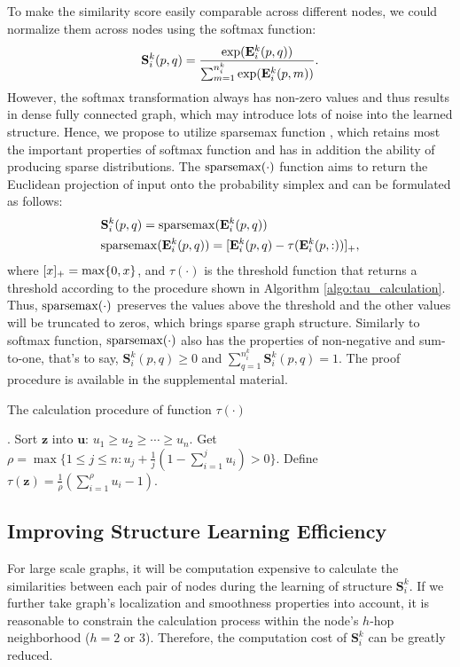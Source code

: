 \documentclass[letterpaper]{article} \usepackage{aaai20}  \usepackage{times}  \usepackage{helvet} \usepackage{courier}  \usepackage[hyphens]{url}  \usepackage{graphicx} \urlstyle{rm} \def\UrlFont{\rm}  \usepackage{graphicx}  \frenchspacing  \setlength{\pdfpagewidth}{8.5in}  \setlength{\pdfpageheight}{11in}
\begin{document}
To make the similarity score easily comparable across different nodes, we could normalize them across nodes using the softmax function:
\begin{equation}
\mathbf{S}_i^k(p,q) = \frac{{\rm exp}(\mathbf{E}_i^k(p,q))}{\sum_{m=1}^{n_i^k}{\rm exp}(\mathbf{E}_i^k(p,m))}.	
\label{eq:softmax}
\end{equation}
However, the softmax transformation always has non-zero values and thus results in dense fully connected graph, which may introduce lots of noise into the learned structure. Hence, we propose to utilize sparsemax function \cite{martins2016softmax}, which retains most the important properties of softmax function and has in addition the ability of producing sparse distributions. The ${\rm sparsemax}(\cdot)$ function aims to return the Euclidean projection of input onto the probability simplex and can be formulated as follows:
\begin{eqnarray}
	&\mathbf{S}_i^k(p,q) = {\rm sparsemax}(\mathbf{E}_i^k(p,q)) \nonumber \\
	&{\rm sparsemax}(\mathbf{E}_i^k(p,q)) = [\mathbf{E}_i^k(p,q) - \tau{(\mathbf{E}_i^k(p,:))}]_+,
	\label{eq:sparse_max}
\end{eqnarray}
where $[x]_+ = {\rm max}\{0, x\}$, and $\tau(\cdot)$ is the threshold function that returns a threshold according to the procedure shown in Algorithm \ref{algo:tau_calculation}. Thus, ${\rm sparsemax}(\cdot)$ preserves the values above the threshold and the other values will be truncated to zeros, which brings sparse graph structure. Similarly to softmax function, ${\rm sparsemax}(\cdot)$ also has the properties of non-negative and sum-to-one, that's to say, $\mathbf{S}_i^k(p,q) \geq 0$ and $\sum_{q=1}^{n_i^k}\mathbf{S}_i^k(p,q) = 1$. The proof procedure is available in the supplemental material.
\begin{algorithm}
  \caption{The calculation procedure of function $\tau(\cdot)$}
  \label{algo:tau_calculation}
  \begin{algorithmic}[1]
    .
    \State Sort $\mathbf{z}$ into $\mathbf{u}$: $u_1 \ge u_2 \ge \cdots \ge u_n$.
    \State Get $\rho = \max \{1 \le j \le n: u_j + \frac{1}{j}(1 - \sum_{i=1}^ju_i) > 0\}$.
    \State Define $\tau(\mathbf{z}) = \frac{1}{\rho}(\sum_{i=1}^{\rho}u_i - 1)$.
  \end{algorithmic}
\end{algorithm}

\subsection{Improving Structure Learning Efficiency}
For large scale graphs, it will be computation expensive to calculate the similarities between each pair of nodes during the learning of structure $\mathbf{S}_i^{k}$. If we further take graph's localization and smoothness properties into account, it is reasonable to constrain the calculation process within the node's $h$-hop neighborhood ($h=2$ or $3$). Therefore, the computation cost of $\mathbf{S}_i^{k}$ can be greatly reduced. 
\end{document}
